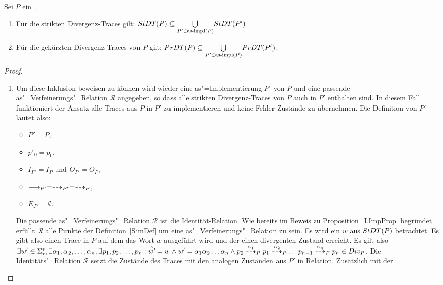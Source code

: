 \begin{Prop}
  \label{DivTraceProp}
  Sei $P$ ein \MEIO{}.
  \begin{enumerate}
    \item Für die strikten Divergenz-Traces gilt: $StDT (P) \subseteq
      \underset{P'\in\mathrm{as}\text{-}\mathrm{impl} (P)}{\bigcup} StDT (P')$.
    \item Für die gekürzten Divergenz-Traces von $P$ gilt:
      $PrDT (P) \subseteq \underset{P'\in\mathrm{as}\text{-}\mathrm{impl} (P)}{\bigcup} PrDT (P')$.
  \end{enumerate}
\end{Prop}
\begin{proof}\mbox{}
  \begin{enumerate}
    \item Um diese Inklusion beweisen zu können wird wieder eine
      as"=Implementierung $P'$ von $P$ und eine passende
      as"=Verfeinerungs"=Relation $\mathcal{R}$ angegeben, so dass alle
      strikten Divergenz-Traces von $P$ auch in $P'$ enthalten sind. In diesem
      Fall funktioniert der Ansatz alle Traces aus $P$ in $P'$ zu
      implementieren und keine Fehler-Zustände zu übernehmen. Die Definition
      von $P'$ lautet also:
      \begin{itemize}
        \item $P'=P$,
        \item $p'_0=p_0$,
        \item $I_{P'}=I_P$ und $O_{P'}=O_P$,
        \item $\must _{P'} =\may _{P'} = \may _P$,
        \item $E_{P'}=\emptyset$.
      \end{itemize}
      Die passende as"=Verfeinerungs"=Relation $\mathcal{R}$ ist die
      Identität-Relation. Wie bereits im Beweis zu Proposition~\ref{LImpProp}
      begründet erfüllt $\mathcal{R}$ alle Punkte der Definition~\ref{SimDef}
      um eine as"=Verfeinerungs"=Relation zu sein. Es wird ein $w$ aus $StDT
      (P)$ betrachtet. Es gibt also einen Trace in $P$ auf dem das Wort $w$
      ausgeführt wird und der einen divergenten Zustand erreicht. Es gilt also
      $\exists w' \in \Sigma _{\tau}^*, \exists \alpha _1, \alpha _2, \dots ,
      \alpha _n, \exists p_1, p_2, \dots , p_n: \hat{w'} = w \land w' = \alpha
      _1\alpha _2\dots\alpha _n \land p_0 \may[\alpha _1]_P p_1 \may[\alpha
      _2]_P \dots p_{n-1} \may[\alpha _n]_P p_n \in Div _P$. Die
      Identitäts"=Relation $\mathcal{R}$ setzt die Zustände des Traces mit den
      analogen Zuständen aus $P'$ in Relation. Zusätzlich mit der

\end{enumerate}
\end{proof}
